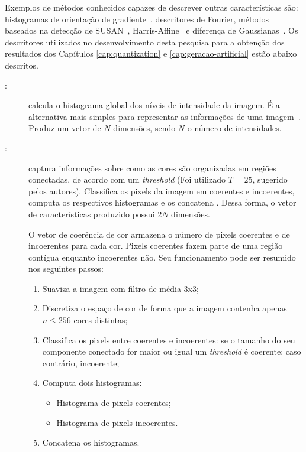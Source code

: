 Exemplos de métodos conhecidos capazes de descrever outras características são: histogramas de orientação de gradiente~\cite{Wang2009}, descritores de Fourier, métodos baseados na detecção de SUSAN~\cite{Smith1997}, Harris-Affine~\cite{Han2005b} e diferença de Gaussianas~\cite{Lowe2004a}. Os descritores utilizados no desenvolvimento desta pesquisa para a obtenção dos resultados dos Capítulos \ref{cap:quantization} e \ref{cap:geracao-artificial} estão abaixo descritos.

\begin{description}
\item[:] calcula o histograma global dos níveis de intensidade da imagem. É a alternativa mais simples para representar as informações de uma imagem~\cite{Gonzalez2007}. Produz um vetor de $N$ dimensões, sendo $N$ o número de intensidades.

\item[:] captura informações sobre como as cores são organizadas em regiões conectadas, de acordo com um \textit{threshold} (Foi utilizado $T = 25$, sugerido pelos autores). Classifica os pixels da imagem em coerentes e incoerentes, computa os respectivos histogramas e os concatena \cite{ccv}. Dessa forma, o vetor de características produzido possui $2N$ dimensões.

O vetor de coerência de cor armazena o número de pixels coerentes e de incoerentes para cada cor. Pixels coerentes fazem parte de uma região contígua enquanto incoerentes não. Seu funcionamento pode ser resumido nos seguintes passos:

\begin{enumerate}
  \item Suaviza a imagem com filtro de média 3x3;
  \item Discretiza o espaço de cor de forma que a imagem contenha apenas $n \leq 256$ cores distintas;
  \item Classifica os pixels entre coerentes e incoerentes: se o tamanho do seu componente conectado for maior ou igual um \textit{threshold} é coerente; caso contrário, incoerente;
  \item Computa dois histogramas:
  \begin{itemize}
    \item Histograma de pixels coerentes;
    \item Histograma de pixels incoerentes.
  \end{itemize}
  \item Concatena os histogramas.
\end{enumerate}


\end{description}
